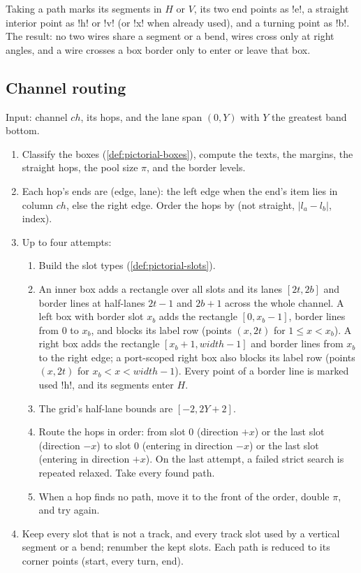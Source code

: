 Taking a path marks its segments in $H$ or $V$, its two end points as \code!e!, a straight interior
point as \code!h! or \code!v! (or \code!x! when already used), and a turning point as \code!b!.
The result: no two wires share a segment or a bend, wires cross only at right angles, and a wire
crosses a box border only to enter or leave that box.

\subsection{Channel routing}\label{sec:pictorial-route}

\begin{algorithm}\label{alg:pictorial-route}
Input: channel $\mathit{ch}$, its hops, and the lane span $(0, Y)$ with $Y$ the greatest band
bottom.
\begin{enumerate}
  \item Classify the boxes (\cref{def:pictorial-boxes}), compute the texts, the margins, the
    straight hops, the pool size $\pi$, and the border levels.
  \item Each hop's ends are (edge, lane): the left edge when the end's item lies in column
    $\mathit{ch}$, else the right edge. Order the hops by (not straight, $|l_a-l_b|$, index).
  \item Up to four attempts:
    \begin{enumerate}
      \item Build the slot types (\cref{def:pictorial-slots}).
      \item An inner box adds a rectangle over all slots and its lanes $[2t, 2b]$ and border
        lines at half-lanes $2t-1$ and $2b+1$ across the whole channel. A left box with border
        slot $x_b$ adds the rectangle $[0, x_b-1]$, border lines from 0 to $x_b$, and blocks its
        label row (points $(x, 2t)$ for $1\le x<x_b$). A right box adds the rectangle
        $[x_b+1, \mathit{width}-1]$ and border lines from $x_b$ to the right edge; a port-scoped
        right box also blocks its label row (points $(x,2t)$ for $x_b<x<\mathit{width}-1$). Every
        point of a border line is marked used \code!h!, and its segments enter $H$.
      \item The grid's half-lane bounds are $[-2, 2Y+2]$.
      \item Route the hops in order: from slot 0 (direction $+x$) or the last slot (direction
        $-x$) to slot 0 (entering in direction $-x$) or the last slot (entering in direction
        $+x$). On the last attempt, a failed strict search is repeated relaxed. Take every
        found path.
      \item When a hop finds no path, move it to the front of the order, double $\pi$, and try
        again.
    \end{enumerate}
  \item Keep every slot that is not a track, and every track slot used by a vertical segment
    or a bend; renumber the kept slots. Each path is reduced to its corner points (start, every
    turn, end).
\end{enumerate}
\end{algorithm}

